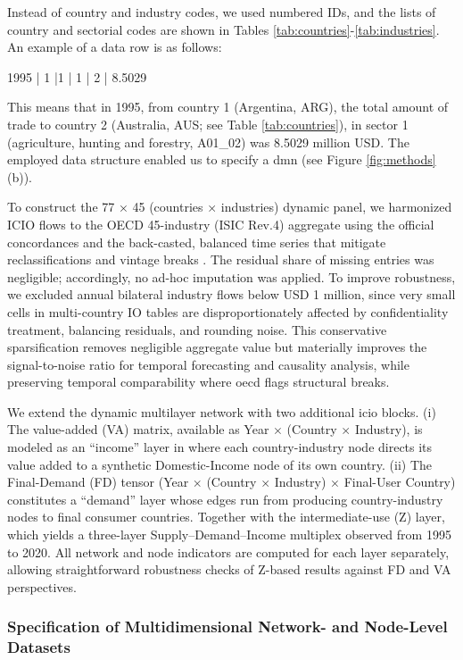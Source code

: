 \documentclass[preprint, 3p,
authoryear]{elsarticle} %
\begin{document}
Instead of country and industry codes, we used numbered IDs, and the
lists of country and sectorial codes are shown in Tables
\ref{tab:countries}-\ref{tab:industries}. An example of a data row is as
follows:

\begin{center}
1995 | 1 |1 | 1 | 2 | 8.5029
\end{center}

This means that in 1995, from country 1 (Argentina, ARG), the total
amount of trade to country 2 (Australia, AUS; see Table
\ref{tab:countries}), in sector 1 (agriculture, hunting and forestry,
A01\_02) was 8.5029 million USD. The employed data structure enabled us
to specify a \gls{dmn} (see Figure \ref{fig:methods}(b)).

To construct the 77 × 45 (countries × industries) dynamic panel, we
harmonized ICIO flows to the OECD 45-industry (ISIC Rev.4) aggregate
using the official concordances and the back-casted, balanced time
series that mitigate reclassifications and vintage breaks
\citep{oecd2020}. The residual share of missing entries was negligible;
accordingly, no ad-hoc imputation was applied. To improve robustness, we
excluded annual bilateral industry flows below USD 1 million, since very
small cells in multi-country IO tables are disproportionately affected
by confidentiality treatment, balancing residuals, and rounding noise.
This conservative sparsification removes negligible aggregate value but
materially improves the signal-to-noise ratio for temporal forecasting
and causality analysis, while preserving temporal comparability where
\gls{oecd} flags structural breaks.

We extend the dynamic multilayer network with two additional \gls{icio}
blocks. (i) The value-added (VA) matrix, available as Year \(\times\)
(Country \(\times\) Industry), is modeled as an ``income'' layer in
where each country-industry node directs its value added to a synthetic
Domestic-Income node of its own country. (ii) The Final-Demand (FD)
tensor (Year \(\times\) (Country \(\times\) Industry) \(\times\)
Final-User Country) constitutes a ``demand'' layer whose edges run from
producing country-industry nodes to final consumer countries. Together
with the intermediate-use (Z) layer, which yields a three-layer
Supply--Demand--Income multiplex observed from 1995 to 2020. All network
and node indicators are computed for each layer separately, allowing
straightforward robustness checks of Z-based results against FD and VA
perspectives.

\subsubsection{Specification of Multidimensional Network- and Node-Level
Datasets}\label{specification-of-multidimensional-network--and-node-level-datasets}
\end{document}
